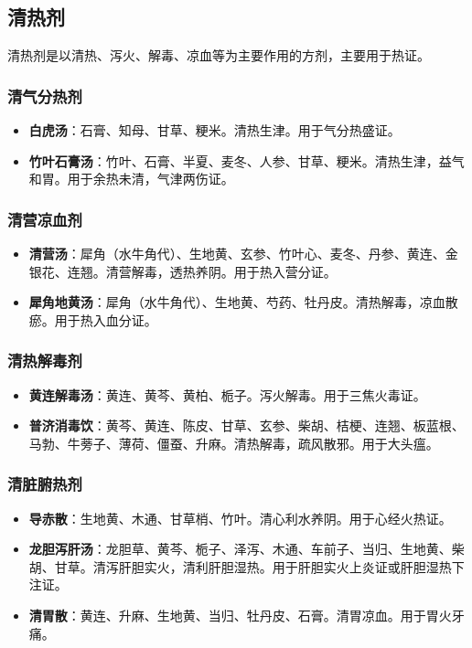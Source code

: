 \documentclass[12pt,UTF8]{ctexbook}
\begin{document}
\subsection{清热剂}

清热剂是以清热、泻火、解毒、凉血等为主要作用的方剂，主要用于热证。

\subsubsection{清气分热剂}

\begin{itemize}
\item \textbf{白虎汤}：石膏、知母、甘草、粳米。清热生津。用于气分热盛证。
\item \textbf{竹叶石膏汤}：竹叶、石膏、半夏、麦冬、人参、甘草、粳米。清热生津，益气和胃。用于余热未清，气津两伤证。
\end{itemize}

\subsubsection{清营凉血剂}

\begin{itemize}
\item \textbf{清营汤}：犀角（水牛角代）、生地黄、玄参、竹叶心、麦冬、丹参、黄连、金银花、连翘。清营解毒，透热养阴。用于热入营分证。
\item \textbf{犀角地黄汤}：犀角（水牛角代）、生地黄、芍药、牡丹皮。清热解毒，凉血散瘀。用于热入血分证。
\end{itemize}

\subsubsection{清热解毒剂}

\begin{itemize}
\item \textbf{黄连解毒汤}：黄连、黄芩、黄柏、栀子。泻火解毒。用于三焦火毒证。
\item \textbf{普济消毒饮}：黄芩、黄连、陈皮、甘草、玄参、柴胡、桔梗、连翘、板蓝根、马勃、牛蒡子、薄荷、僵蚕、升麻。清热解毒，疏风散邪。用于大头瘟。
\end{itemize}

\subsubsection{清脏腑热剂}

\begin{itemize}
\item \textbf{导赤散}：生地黄、木通、甘草梢、竹叶。清心利水养阴。用于心经火热证。
\item \textbf{龙胆泻肝汤}：龙胆草、黄芩、栀子、泽泻、木通、车前子、当归、生地黄、柴胡、甘草。清泻肝胆实火，清利肝胆湿热。用于肝胆实火上炎证或肝胆湿热下注证。
\item \textbf{清胃散}：黄连、升麻、生地黄、当归、牡丹皮、石膏。清胃凉血。用于胃火牙痛。
\end{itemize}
\end{document}
